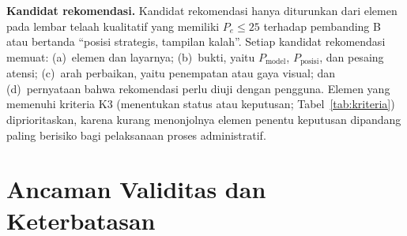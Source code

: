 \textbf{Kandidat rekomendasi.} Kandidat rekomendasi hanya diturunkan dari elemen pada lembar telaah kualitatif yang memiliki $P_e \leq 25$ terhadap pembanding B atau bertanda ``posisi strategis, tampilan kalah''. Setiap kandidat rekomendasi memuat: (a)~elemen dan layarnya; (b)~bukti, yaitu $P_{\text{model}}$, $P_{\text{posisi}}$, dan pesaing atensi; (c)~arah perbaikan, yaitu penempatan atau gaya visual; dan (d)~pernyataan bahwa rekomendasi perlu diuji dengan pengguna. Elemen yang memenuhi kriteria K3 (menentukan status atau keputusan; Tabel~\ref{tab:kriteria}) diprioritaskan, karena kurang menonjolnya elemen penentu keputusan dipandang paling berisiko bagi pelaksanaan proses administratif.

\section{Ancaman Validitas dan Keterbatasan}
\label{sec:validitas}

